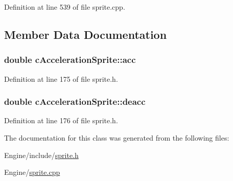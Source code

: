 Definition at line 539 of file sprite.\-cpp.



\subsection{Member Data Documentation}
\hypertarget{classc_acceleration_sprite_aa09f3836673b3b48058edd7ca6876309}{
\subsubsection[{acc}]{\setlength{\rightskip}{0pt plus 5cm}double c\-Acceleration\-Sprite\-::acc}}\label{classc_acceleration_sprite_aa09f3836673b3b48058edd7ca6876309}


Definition at line 175 of file sprite.\-h.

\hypertarget{classc_acceleration_sprite_aabd23a5d522e74532f5870ec8e28eaf6}{
\subsubsection[{deacc}]{\setlength{\rightskip}{0pt plus 5cm}double c\-Acceleration\-Sprite\-::deacc}}\label{classc_acceleration_sprite_aabd23a5d522e74532f5870ec8e28eaf6}


Definition at line 176 of file sprite.\-h.



The documentation for this class was generated from the following files\-:\begin{DoxyCompactItemize}
\item 
Engine/include/\hyperlink{sprite_8h}{sprite.\-h}\item 
Engine/\hyperlink{sprite_8cpp}{sprite.\-cpp}\end{DoxyCompactItemize}
